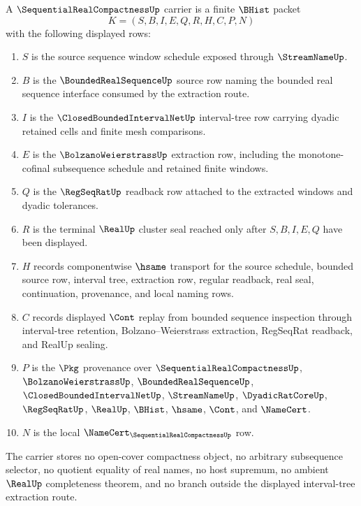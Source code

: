 \begin{definition}
\label{def:sequential-real-compactness-carrier}
A $\SequentialRealCompactnessUp$ carrier is a finite $\BHist$ packet
$$
K=(S,B,I,E,Q,R,H,C,P,N)
$$
with the following displayed rows:
\begin{enumerate}
\item $S$ is the source sequence window schedule exposed through $\StreamNameUp$.
\item $B$ is the $\BoundedRealSequenceUp$ source row naming the bounded real sequence interface consumed by the extraction route.
\item $I$ is the $\ClosedBoundedIntervalNetUp$ interval-tree row carrying dyadic retained cells and finite mesh comparisons.
\item $E$ is the $\BolzanoWeierstrassUp$ extraction row, including the monotone-cofinal subsequence schedule and retained finite windows.
\item $Q$ is the $\RegSeqRatUp$ readback row attached to the extracted windows and dyadic tolerances.
\item $R$ is the terminal $\RealUp$ cluster seal reached only after $S,B,I,E,Q$ have been displayed.
\item $H$ records componentwise $\hsame$ transport for the source schedule, bounded source row, interval tree, extraction row, regular readback, real seal, continuation, provenance, and local naming rows.
\item $C$ records displayed $\Cont$ replay from bounded sequence inspection through interval-tree retention, Bolzano--Weierstrass extraction, RegSeqRat readback, and RealUp sealing.
\item $P$ is the $\Pkg$ provenance over $\SequentialRealCompactnessUp$, $\BolzanoWeierstrassUp$, $\BoundedRealSequenceUp$, $\ClosedBoundedIntervalNetUp$, $\StreamNameUp$, $\DyadicRatCoreUp$, $\RegSeqRatUp$, $\RealUp$, $\BHist$, $\hsame$, $\Cont$, and $\NameCert$.
\item $N$ is the local $\NameCert_{\SequentialRealCompactnessUp}$ row.
\end{enumerate}
The carrier stores no open-cover compactness object, no arbitrary subsequence selector, no quotient equality of real names, no host supremum, no ambient $\RealUp$ completeness theorem, and no branch outside the displayed interval-tree extraction route.
\end{definition}

